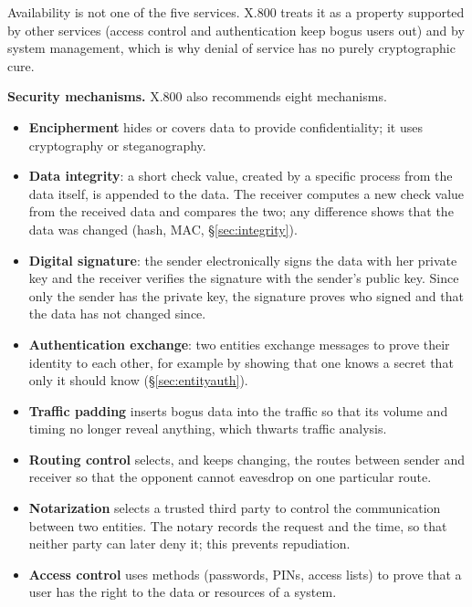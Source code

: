 Availability is not one of the five services. X.800 treats it as a property supported by other services (access control and authentication keep bogus users out) and by system management, which is why denial of service has no purely cryptographic cure.

\textbf{Security mechanisms.} X.800 also recommends eight mechanisms.
\begin{itemize}[leftmargin=1.4em]
  \item \textbf{Encipherment} hides or covers data to provide confidentiality; it uses cryptography or steganography.
  \item \textbf{Data integrity}: a short check value, created by a specific process from the data itself, is appended to the data. The receiver computes a new check value from the received data and compares the two; any difference shows that the data was changed (hash, MAC, \S\ref{sec:integrity}).
  \item \textbf{Digital signature}: the sender electronically signs the data with her private key and the receiver verifies the signature with the sender's public key. Since only the sender has the private key, the signature proves who signed and that the data has not changed since.
  \item \textbf{Authentication exchange}: two entities exchange messages to prove their identity to each other, for example by showing that one knows a secret that only it should know (\S\ref{sec:entityauth}).
  \item \textbf{Traffic padding} inserts bogus data into the traffic so that its volume and timing no longer reveal anything, which thwarts traffic analysis.
  \item \textbf{Routing control} selects, and keeps changing, the routes between sender and receiver so that the opponent cannot eavesdrop on one particular route.
  \item \textbf{Notarization} selects a trusted third party to control the communication between two entities. The notary records the request and the time, so that neither party can later deny it; this prevents repudiation.
  \item \textbf{Access control} uses methods (passwords, PINs, access lists) to prove that a user has the right to the data or resources of a system.
\end{itemize}

